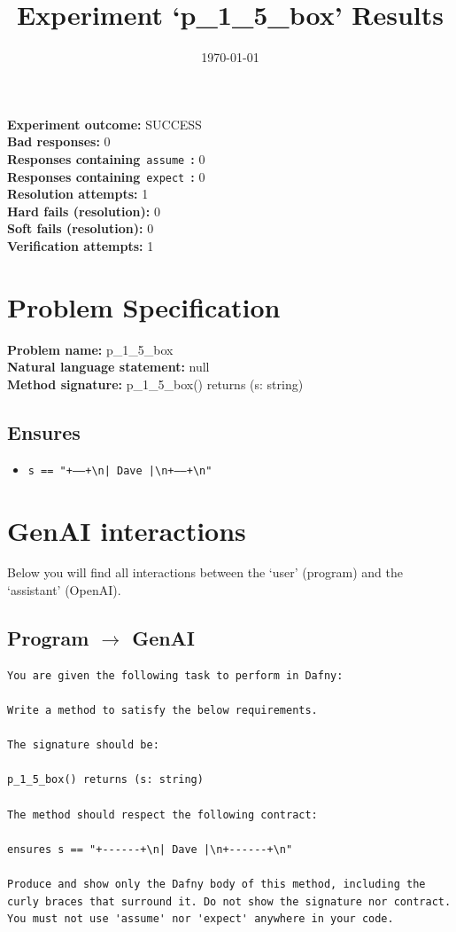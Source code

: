 \documentclass{article}
\begin{document}
\title{Experiment `p\_1\_5\_box' Results}
\author{\today}
\date{}
\maketitle
\textbf{Experiment outcome: }SUCCESS
\\\textbf{Bad responses: }0
\\\textbf{Responses containing}~\texttt{assume}~\textbf{: }0
\\\textbf{Responses containing}~\texttt{expect}~\textbf{: }0
\\\textbf{Resolution attempts: }1
\\\textbf{Hard fails (resolution): }0
\\\textbf{Soft fails (resolution): }0
\\\textbf{Verification attempts: }1
\section*{Problem Specification}
\textbf{Problem name: }p\_1\_5\_box
\\\textbf{Natural language statement: }null
\\\textbf{Method signature: }p\_1\_5\_box() returns (s: string)
\subsection*{Ensures}
\begin{itemize}
\item \texttt{s == "+------+\textbackslash{}n| Dave |\textbackslash{}n+------+\textbackslash{}n"}
\end{itemize}
\clearpage
\section*{GenAI interactions}
Below you will find all interactions between the `user' (program) and the `assistant' (OpenAI).
\subsection*{Program $\rightarrow$ GenAI}
\begin{lstlisting}
You are given the following task to perform in Dafny:

Write a method to satisfy the below requirements.

The signature should be:

p_1_5_box() returns (s: string)

The method should respect the following contract:

ensures s == "+------+\n| Dave |\n+------+\n"

Produce and show only the Dafny body of this method, including the curly braces that surround it. Do not show the signature nor contract. You must not use 'assume' nor 'expect' anywhere in your code.
\end{lstlisting}
\end{document}
